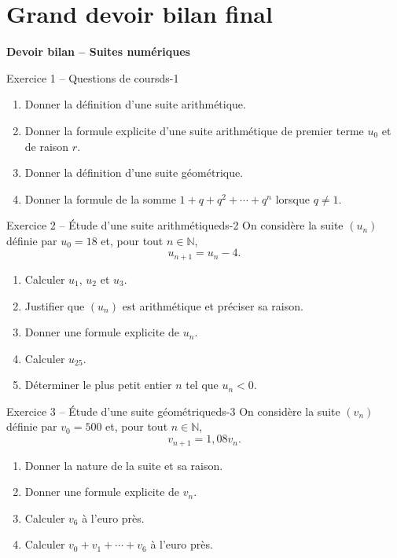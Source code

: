 \documentclass[11pt,a4paper]{article}
\newcommand{\N}{\mathbb{N}}
\begin{document}
\newpage
\section{Grand devoir bilan final}

\begin{center}
\Large\bfseries Devoir bilan -- Suites numériques\end{center}

\begin{exercisebox}{Exercice 1 -- Questions de cours}{ds-1}
\begin{enumerate}
  \item Donner la définition d'une suite arithmétique.
  \item Donner la formule explicite d'une suite arithmétique de premier terme $u_0$ et de raison $r$.
  \item Donner la définition d'une suite géométrique.
  \item Donner la formule de la somme $1+q+q^2+\cdots+q^n$ lorsque $q\neq1$.
\end{enumerate}
\end{exercisebox}

\begin{exercisebox}{Exercice 2 -- Étude d'une suite arithmétique}{ds-2}
On considère la suite $(u_n)$ définie par $u_0=18$ et, pour tout $n\in\N$,
\[
 u_{n+1}=u_n-4.
\]
\begin{enumerate}
  \item Calculer $u_1$, $u_2$ et $u_3$.
  \item Justifier que $(u_n)$ est arithmétique et préciser sa raison.
  \item Donner une formule explicite de $u_n$.
  \item Calculer $u_{25}$.
  \item Déterminer le plus petit entier $n$ tel que $u_n<0$.
\end{enumerate}
\end{exercisebox}

\begin{exercisebox}{Exercice 3 -- Étude d'une suite géométrique}{ds-3}
On considère la suite $(v_n)$ définie par $v_0=500$ et, pour tout $n\in\N$,
\[
 v_{n+1}=1{,}08v_n.
\]
\begin{enumerate}
  \item Donner la nature de la suite et sa raison.
  \item Donner une formule explicite de $v_n$.
  \item Calculer $v_6$ à l'euro près.
  \item Calculer $v_0+v_1+\cdots+v_6$ à l'euro près.
\end{enumerate}
\end{exercisebox}
\end{document}
